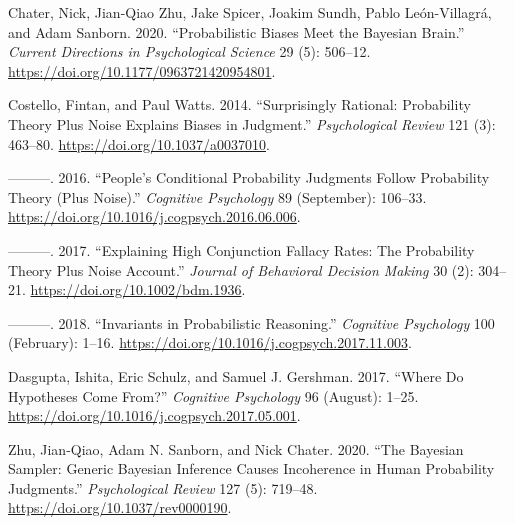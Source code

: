 \documentclass{article}
\newlength{\cslhangindent}
\newlength{\cslentryspacingunit} %
\newenvironment{CSLReferences}[2] %
 {%
  \setlength{\parindent}{0pt}
  \ifodd #1
  \let\oldpar\par
  \def\par{\hangindent=\cslhangindent\oldpar}
  \fi
  \setlength{\parskip}{#2\cslentryspacingunit}
 }%
 {}
\begin{document}
\hypertarget{refs}{}
\begin{CSLReferences}{1}{0}
\leavevmode\hypertarget{ref-chater.etal2020}{}%
Chater, Nick, Jian-Qiao Zhu, Jake Spicer, Joakim Sundh, Pablo
León-Villagrá, and Adam Sanborn. 2020. {``Probabilistic {Biases Meet}
the {Bayesian Brain}.''} \emph{Current Directions in Psychological
Science} 29 (5): 506--12.
\url{https://doi.org/10.1177/0963721420954801}.

\leavevmode\hypertarget{ref-costello.watts2014}{}%
Costello, Fintan, and Paul Watts. 2014. {``Surprisingly Rational:
{Probability} Theory Plus Noise Explains Biases in Judgment.''}
\emph{Psychological Review} 121 (3): 463--80.
\url{https://doi.org/10.1037/a0037010}.

\leavevmode\hypertarget{ref-costello.watts2016}{}%
---------. 2016. {``People's Conditional Probability Judgments Follow
Probability Theory (Plus Noise).''} \emph{Cognitive Psychology} 89
(September): 106--33.
\url{https://doi.org/10.1016/j.cogpsych.2016.06.006}.

\leavevmode\hypertarget{ref-costello.watts2017}{}%
---------. 2017. {``Explaining {High Conjunction Fallacy Rates}: {The
Probability Theory Plus Noise Account}.''} \emph{Journal of Behavioral
Decision Making} 30 (2): 304--21.
\url{https://doi.org/10.1002/bdm.1936}.

\leavevmode\hypertarget{ref-costello.watts2018}{}%
---------. 2018. {``Invariants in Probabilistic Reasoning.''}
\emph{Cognitive Psychology} 100 (February): 1--16.
\url{https://doi.org/10.1016/j.cogpsych.2017.11.003}.

\leavevmode\hypertarget{ref-dasgupta.etal2017}{}%
Dasgupta, Ishita, Eric Schulz, and Samuel J. Gershman. 2017. {``Where Do
Hypotheses Come From?''} \emph{Cognitive Psychology} 96 (August): 1--25.
\url{https://doi.org/10.1016/j.cogpsych.2017.05.001}.

\leavevmode\hypertarget{ref-zhu.etal2020}{}%
Zhu, Jian-Qiao, Adam N. Sanborn, and Nick Chater. 2020. {``The
{Bayesian} Sampler: {Generic Bayesian} Inference Causes Incoherence in
Human Probability Judgments.''} \emph{Psychological Review} 127 (5):
719--48. \url{https://doi.org/10.1037/rev0000190}.

\end{CSLReferences}



\end{document}
